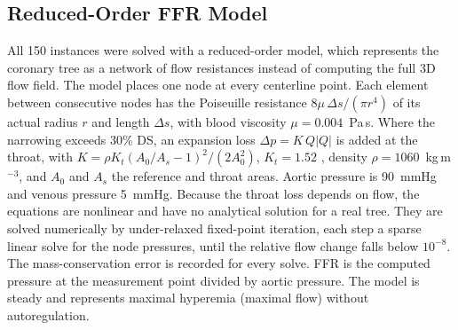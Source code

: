 \documentclass[journal]{IEEEtran}
\begin{document}
\subsection{Reduced-Order FFR Model}
All 150 instances were solved with a reduced-order model, which represents the coronary tree as a network of flow
resistances instead of computing the full 3D flow field. The model places one node at every centerline point. Each element between consecutive nodes has the Poiseuille
resistance $8\mu\,\Delta s/(\pi r^4)$ of its actual radius $r$ and length $\Delta s$, with blood viscosity
$\mu = 0.004$~Pa\,s. Where the narrowing exceeds 30\% DS, an expansion loss $\Delta p = K\,Q|Q|$ is added at the
throat, with $K = \rho K_t (A_0/A_s - 1)^2 / (2A_0^2)$, $K_t = 1.52$ \cite{young1973}, density
$\rho = 1060$~kg\,m$^{-3}$, and $A_0$ and $A_s$ the reference and throat areas. Aortic pressure is 90~mmHg and
venous pressure 5~mmHg. Because the throat loss depends on flow, the equations are nonlinear and have no analytical solution
for a real tree. They are solved numerically by under-relaxed fixed-point iteration, each step a sparse linear
solve for the node pressures, until the relative flow change falls below $10^{-8}$. The mass-conservation error is recorded for every solve. FFR is the computed
pressure at the measurement point divided by aortic pressure. The model is steady and represents maximal hyperemia
(maximal flow) without autoregulation.
\end{document}
